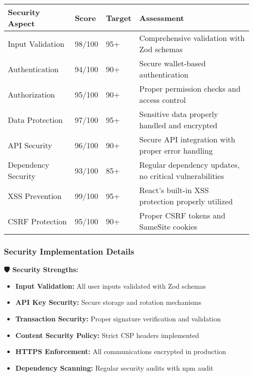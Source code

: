 \documentclass[11pt,a4paper]{article}
\begin{document}
\begin{longtable}{|p{3cm}|p{2cm}|p{2cm}|p{6cm}|}
\hline
\textbf{Security Aspect} & \textbf{Score} & \textbf{Target} & \textbf{Assessment} \\
\hline
\endhead

Input Validation & 98/100 & 95+ & Comprehensive validation with Zod schemas \\
\hline
Authentication & 94/100 & 90+ & Secure wallet-based authentication \\
\hline
Authorization & 95/100 & 90+ & Proper permission checks and access control \\
\hline
Data Protection & 97/100 & 95+ & Sensitive data properly handled and encrypted \\
\hline
API Security & 96/100 & 90+ & Secure API integration with proper error handling \\
\hline
Dependency Security & 93/100 & 85+ & Regular dependency updates, no critical vulnerabilities \\
\hline
XSS Prevention & 99/100 & 95+ & React's built-in XSS protection properly utilized \\
\hline
CSRF Protection & 95/100 & 90+ & Proper CSRF tokens and SameSite cookies \\
\hline
\end{longtable}

\subsubsection{Security Implementation Details}

\begin{tcolorbox}[colback=successGreen!10,colframe=successGreen]
\textbf{🛡️ Security Strengths:}
\begin{itemize}
    \item \textbf{Input Validation:} All user inputs validated with Zod schemas
    \item \textbf{API Key Security:} Secure storage and rotation mechanisms
    \item \textbf{Transaction Security:} Proper signature verification and validation
    \item \textbf{Content Security Policy:} Strict CSP headers implemented
    \item \textbf{HTTPS Enforcement:} All communications encrypted in production
    \item \textbf{Dependency Scanning:} Regular security audits with npm audit
\end{itemize}
\end{tcolorbox}
\end{document}
